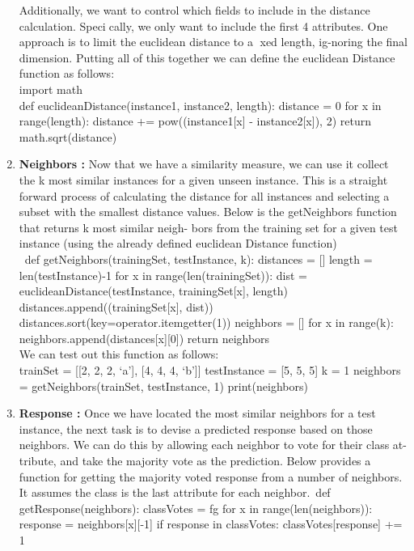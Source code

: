 \documentclass{article}
\begin{document}
\begin{enumerate}
		Additionally, we want to control which fields to include in the distance calculation. Specically, we only want to include the first 4 attributes.
		One approach is to limit the euclidean distance to a xed length, ig-noring the final dimension.
		Putting all of this together we can define the euclidean Distance\\
		function as follows:\\
		import math\\
		def euclideanDistance(instance1, instance2, length): distance = 0 for
		x in range(length): distance += pow((instance1[x] - instance2[x]), 2)
		return math.sqrt(distance)
		\item \textbf{Neighbors :}
		Now that we have a similarity measure, we can use it collect the k
		most similar instances for a given unseen instance.
		This is a straight forward process of calculating the distance for all
		instances and selecting a subset with the smallest distance values.
		Below is the getNeighbors function that returns k most similar neigh-
		bors from the training set for a given test instance (using the already
		defined euclidean Distance function)\\\
		def getNeighbors(trainingSet, testInstance, k): distances = [] length =
		len(testInstance)-1
		for x in range(len(trainingSet)): dist = euclideanDistance(testInstance,
		trainingSet[x], length) distances.append((trainingSet[x], dist))
		distances.sort(key=operator.itemgetter(1)) neighbors = []
		for x in range(k): neighbors.append(distances[x][0])
		return neighbors\\We can test out this function as follows:\\trainSet = [[2, 2, 2, `a'], [4, 4, 4, `b']] testInstance = [5, 5, 5] k =
		1
		neighbors = getNeighbors(trainSet, testInstance, 1) print(neighbors)
		\item \textbf{Response :}
		Once we have located the most similar neighbors for a test instance,
		the next task is to devise a predicted response based on those neighbors.
		We can do this by allowing each neighbor to vote for their class at-
		tribute, and take the majority vote as the prediction.
		Below provides a function for getting the majority voted response from
		a number of neighbors. It assumes the class is the last attribute for
		each neighbor.\
		def getResponse(neighbors): classVotes = fg
		for x in range(len(neighbors)): response = neighbors[x][-1] if response
		in classVotes: classVotes[response] += 1

\end{enumerate}
\end{document}
